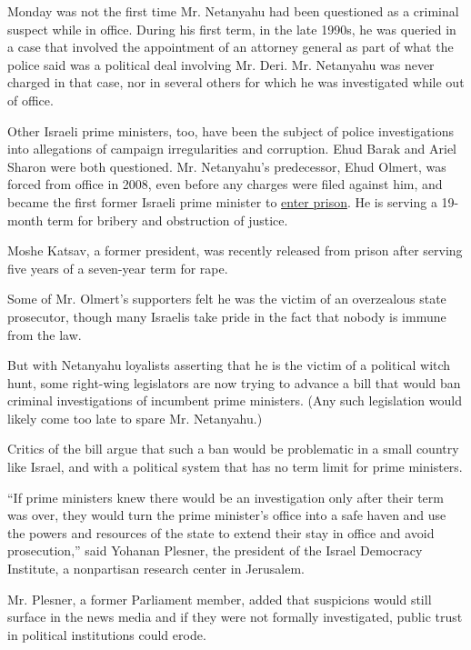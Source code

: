 Monday was not the first time Mr. Netanyahu had been questioned as a
criminal suspect while in office. During his first term, in the late
1990s, he was queried in a case that involved the appointment of an
attorney general as part of what the police said was a political deal
involving Mr. Deri. Mr. Netanyahu was never charged in that case, nor in
several others for which he was investigated while out of office.

Other Israeli prime ministers, too, have been the subject of police
investigations into allegations of campaign irregularities and
corruption. Ehud Barak and Ariel Sharon were both questioned. Mr.
Netanyahu's predecessor, Ehud Olmert, was forced from office in 2008,
even before any charges were filed against him, and became the first
former Israeli prime minister to
\href{http://www.nytimes.com/2016/02/16/world/middleeast/ehud-olmert-israel-prison.html}{enter
prison}. He is serving a 19-month term for bribery and obstruction of
justice.

Moshe Katsav, a former president, was recently released from prison
after serving five years of a seven-year term for rape.

Some of Mr. Olmert's supporters felt he was the victim of an overzealous
state prosecutor, though many Israelis take pride in the fact that
nobody is immune from the law.

But with Netanyahu loyalists asserting that he is the victim of a
political witch hunt, some right-wing legislators are now trying to
advance a bill that would ban criminal investigations of incumbent prime
ministers. (Any such legislation would likely come too late to spare Mr.
Netanyahu.)

Critics of the bill argue that such a ban would be problematic in a
small country like Israel, and with a political system that has no term
limit for prime ministers.

``If prime ministers knew there would be an investigation only after
their term was over, they would turn the prime minister's office into a
safe haven and use the powers and resources of the state to extend their
stay in office and avoid prosecution,'' said Yohanan Plesner, the
president of the Israel Democracy Institute, a nonpartisan research
center in Jerusalem.

Mr. Plesner, a former Parliament member, added that suspicions would
still surface in the news media and if they were not formally
investigated, public trust in political institutions could erode.

